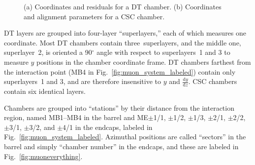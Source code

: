 \begin{figure}
\centering
{}
\hfill {}

\caption{(a) Coordinates and residuals for a DT chamber. (b) Coordinates and alignment parameters for a CSC chamber.}
\end{figure}

DT layers are grouped into four-layer ``superlayers,'' each of which
measures one coordinate.  Most DT chambers contain three~superlayers, and
the middle one, superlayer~2, is oriented a 90$^\circ$ angle with
respect to superlayers~1 and 3 to measure $y$ positions in the chamber
coordinate frame.  DT chambers farthest from the interaction point
(MB4 in Fig.~\ref{fig:muon_system_labeled}) contain only superlayers~1
and 3, and are therefore insensitive to $y$ and $\frac{\textrm{d}y}{\textrm{d}z}$.  CSC
chambers contain six identical layers.

Chambers are grouped into ``stations'' by their distance from the
interaction region, named MB1--MB4 in the barrel and ME$\pm$1/1,
$\pm$1/2, $\pm$1/3, $\pm$2/1, $\pm$2/2, $\pm$3/1, $\pm$3/2, and
$\pm$4/1 in the endcaps, labeled in
Fig.~\ref{fig:muon_system_labeled}.  Azimuthal positions are called
``sectors'' in the barrel and simply ``chamber number'' in the
endcaps, and these are labeled in Fig.~\ref{fig:muoneverything}.

